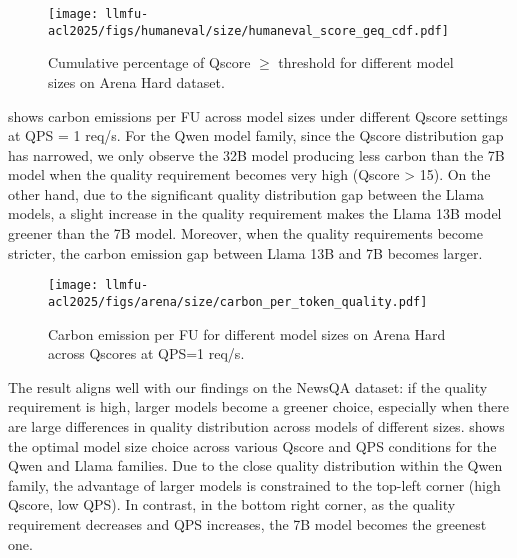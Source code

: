 \begin{figure}[!t]
    \centering
    \texttt{[image: llmfu-acl2025/figs/humaneval/size/humaneval\_score\_geq\_cdf.pdf]}
    \caption{Cumulative percentage of Qscore $\geq$ threshold for different model sizes on Arena Hard dataset.}
    \label{fig:arena_size_score_dist_cumu}
\end{figure}

 shows carbon emissions per FU across model sizes under different Qscore settings at QPS = 1 req/s. For the Qwen model family, since the Qscore distribution gap has narrowed, we only observe the 32B model producing less carbon than the 7B model when the quality requirement becomes very high (Qscore > 15). On the other hand, due to the significant quality distribution gap between the Llama models, a slight increase in the quality requirement makes the Llama 13B model greener than the 7B model. Moreover, when the quality requirements become stricter, the carbon emission gap between Llama 13B and 7B becomes larger.

\begin{figure}[!t]
    \centering
    \texttt{[image: llmfu-acl2025/figs/arena/size/carbon\_per\_token\_quality.pdf]}
    \caption{Carbon emission per FU for different model sizes on Arena Hard across Qscores at QPS=1 req/s.}
    \label{fig:arena_size_carbon_per_token_quality}
\end{figure}





The result aligns well with our findings on the NewsQA dataset: if the quality requirement is high, larger models become a greener choice, especially when there are large differences in quality distribution across models of different sizes.  shows the optimal model size choice across various Qscore and QPS conditions for the Qwen and Llama families. Due to the close quality distribution within the Qwen family, the advantage of larger models is constrained to the top-left corner (high Qscore, low QPS). In contrast, in the bottom right corner, as the quality requirement decreases and QPS increases, the 7B model becomes the greenest one.



